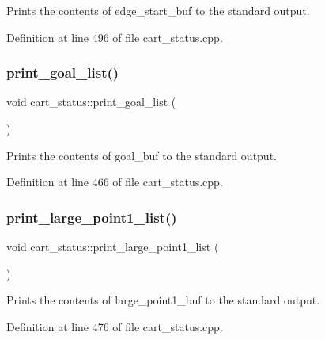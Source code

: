 Prints the contents of edge\+\_\+start\+\_\+buf to the standard output. 

Definition at line 496 of file cart\+\_\+status.\+cpp.

\mbox{\label{classcart__status_a07d3f2bf7b4e430645ae22ffb46143cb}} 
\subsubsection{\texorpdfstring{print\+\_\+goal\+\_\+list()}{print\_goal\_list()}}
{\footnotesize\ttfamily void cart\+\_\+status\+::print\+\_\+goal\+\_\+list (\begin{DoxyParamCaption}{ }\end{DoxyParamCaption})}

Prints the contents of goal\+\_\+buf to the standard output. 

Definition at line 466 of file cart\+\_\+status.\+cpp.

\mbox{\label{classcart__status_a9decf11bef6e36c350463102401c247e}} 
\subsubsection{\texorpdfstring{print\+\_\+large\+\_\+point1\+\_\+list()}{print\_large\_point1\_list()}}
{\footnotesize\ttfamily void cart\+\_\+status\+::print\+\_\+large\+\_\+point1\+\_\+list (\begin{DoxyParamCaption}{ }\end{DoxyParamCaption})}

Prints the contents of large\+\_\+point1\+\_\+buf to the standard output. 

Definition at line 476 of file cart\+\_\+status.\+cpp.

\mbox{\label{classcart__status_a8a6a9273616bef95c4d0aeccb2524aaa}} 
